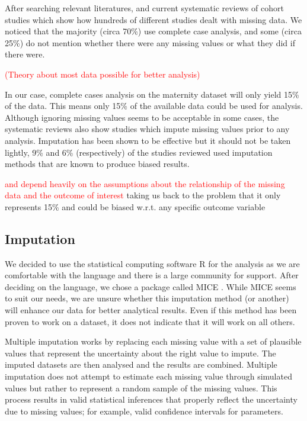 \documentclass[conference,compsoc]{IEEEtran}
\begin{document}
		After searching relevant literatures, and current systematic reviews of cohort studies \cite{systematic1,systematic2,systematic3} which show how hundreds of different studies dealt with missing data. We noticed that the majority (circa 70\%) use complete case analysis, and some (circa 25\%) do not mention whether there were any missing values or what they did if there were. 

		\textcolor{red}{(Theory about most data possible for better analysis)} 

		In our case, complete cases analysis on the maternity dataset will only yield 15\% of the data. This means only 15\% of the available data could be used for analysis. Although ignoring missing values seems to be acceptable in some cases, the systematic reviews also show studies which impute missing values prior to any analysis. Imputation has been shown to be effective\cite{impact} but it should not be taken lightly, 9\% and 6\% (respectively) of the studies reviewed \cite{systematic1,systematic2} used imputation methods that are known to produce biased results\cite{mean}.

		\textcolor{red}{and depend heavily on the assumptions about the relationship of the missing data and the outcome of interest}
		taking us back to the problem that it only represents 15\% and could be biased w.r.t. any specific outcome variable

		\subsection{Imputation} %
		\label{sub:imputation}
		We decided to use the statistical computing software R \cite{r} for the analysis as we are comfortable with the language and there is a large community for support. After deciding on the language, we chose a package called MICE \cite{mice}. While MICE seems to suit our needs, we are unsure whether this imputation method (or another) will enhance our data for better analytical results. Even if this method has been proven to work on a dataset, it does not indicate that it will work on all others. 

		Multiple imputation works by replacing each missing value with a set of plausible values that represent the uncertainty about the right value to impute. The imputed datasets are then analysed and the results are combined. Multiple imputation does not attempt to estimate each missing value through simulated values but rather to represent a random sample of the missing values. This process results in valid statistical inferences that properly reflect the uncertainty due to missing values; for example, valid confidence intervals for parameters\cite{mi}. 
\end{document}
